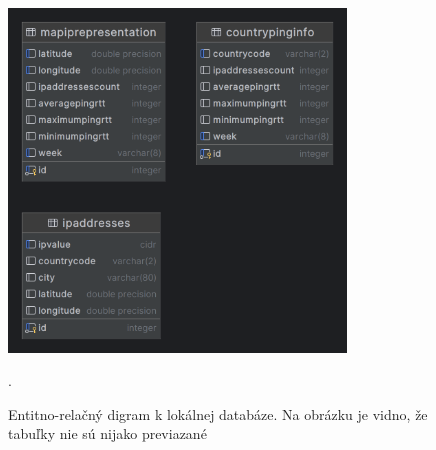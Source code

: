 \begin{figure}
    \centerline{\includegraphics[width=0.8\textwidth]{images/ipinfoviewerprocesseddb}}
    \caption[Entitno-relačný digram k lokálnej databáze]{Entitno-relačný digram k lokálnej databáze. 
    Na obrázku je vidno, že tabuľky nie sú nijako previazané}.
    \label{obr:entitn_diagram}
\end{figure}